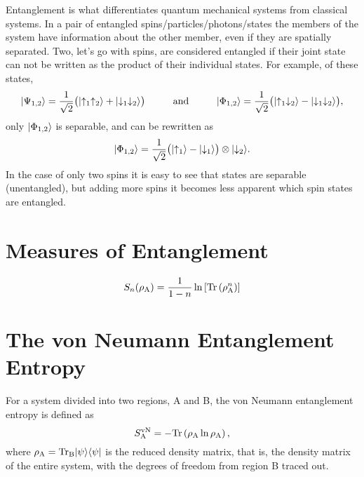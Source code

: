 Entanglement is what differentiates quantum mechanical systems from classical systems.
In a pair of entangled spins/particles/photons/states the members of the system have information about the other member, even if they are spatially separated.
Two, let's go with spins, are considered entangled if their joint state can not be written as the product of their individual states.  For example, of these states,
\begin{equation}
\lvert {\Psi_{1,2}} \rangle = \frac{1}{\sqrt{2}} \big( \lvert {\uparrow_1\uparrow_2} \rangle + \lvert {\downarrow_1\downarrow_2} \rangle\big) 
\hspace{1cm} \text{and} \hspace{1cm}
\lvert {\Phi_{1,2}} \rangle = \frac{1}{\sqrt{2}} \big( \lvert {\uparrow_1\downarrow_2} \rangle - \lvert {\downarrow_1\downarrow_2} \rangle\big), 
\end{equation}
only $\lvert {\Phi_{1,2}} \rangle$ is separable, and can be rewritten as
 \begin{equation}
\lvert {\Phi_{1,2}} \rangle = \frac{1}{\sqrt{2}}  \big( \lvert {\uparrow_1} \rangle - \lvert {\downarrow_1} \rangle\big) \otimes \lvert {\downarrow_2} \rangle.
\end{equation}
In the case of only two spins it is easy to see that states are separable (unentangled), but adding more spins it becomes less apparent which spin states are entangled.
\section{Measures of Entanglement}

\begin{equation} \label{renyi}
 	S_n(\rho_{\rm A}) = \frac{1}{1-n}\ln\left[{\rm Tr}\left( \rho_{\rm A}^n \right) \right]
\end{equation}


\section{The von Neumann Entanglement Entropy}

For a system divided into two regions, A and B, the von Neumann entanglement entropy is defined as
\begin{equation}
	S^{\text{vN}}_\text{A} = -\rm{Tr}\left({\rho_A \ln \rho_A}\right),
\end{equation}
where $\rho_{\rm{A}}=\rm{Tr}_B\lvert {\psi} \rangle\langle {\psi} \rvert$ is the reduced density matrix, that is, the density matrix of the entire system, with the degrees of freedom from region B traced out.
